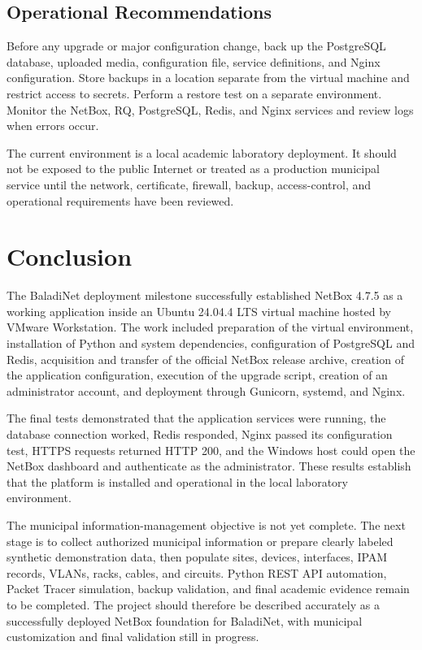 \documentclass[11pt,a4paper,oneside]{report}
\begin{document}
\section{Operational Recommendations}
Before any upgrade or major configuration change, back up the PostgreSQL database, uploaded media, configuration file, service definitions, and Nginx configuration. Store backups in a location separate from the virtual machine and restrict access to secrets. Perform a restore test on a separate environment. Monitor the NetBox, RQ, PostgreSQL, Redis, and Nginx services and review logs when errors occur.

The current environment is a local academic laboratory deployment. It should not be exposed to the public Internet or treated as a production municipal service until the network, certificate, firewall, backup, access-control, and operational requirements have been reviewed.

\chapter{Conclusion}

The BaladiNet deployment milestone successfully established NetBox 4.7.5 as a working application inside an Ubuntu 24.04.4 LTS virtual machine hosted by VMware Workstation. The work included preparation of the virtual environment, installation of Python and system dependencies, configuration of PostgreSQL and Redis, acquisition and transfer of the official NetBox release archive, creation of the application configuration, execution of the upgrade script, creation of an administrator account, and deployment through Gunicorn, systemd, and Nginx.

The final tests demonstrated that the application services were running, the database connection worked, Redis responded, Nginx passed its configuration test, HTTPS requests returned HTTP 200, and the Windows host could open the NetBox dashboard and authenticate as the administrator. These results establish that the platform is installed and operational in the local laboratory environment.

The municipal information-management objective is not yet complete. The next stage is to collect authorized municipal information or prepare clearly labeled synthetic demonstration data, then populate sites, devices, interfaces, IPAM records, VLANs, racks, cables, and circuits. Python REST API automation, Packet Tracer simulation, backup validation, and final academic evidence remain to be completed. The project should therefore be described accurately as a successfully deployed NetBox foundation for BaladiNet, with municipal customization and final validation still in progress.
\end{document}
